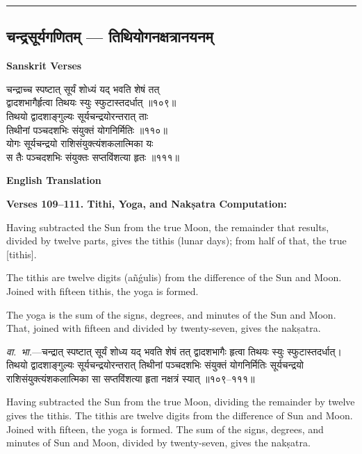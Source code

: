 \documentclass[11pt,a4paper]{article}
\newcommand{\longline}{\noindent\rule{\textwidth}{0.4pt}}
\newcommand{\dev}[1]{{\devanagarifont #1}}
\newcommand{\sectsep}{\par\vspace{0.8em}\longline\vspace{0.8em}}
\begin{document}
\sectsep

\subsection{\dev{चन्द्रसूर्यगणितम् --- तिथियोगनक्षत्रानयनम्}}
\label{subsec:luni-solar}

\begin{minipage}[t]{0.48\textwidth}
\textbf{\small Sanskrit Verses}

\small\devanagarifont
चन्द्राच्च स्पष्टात् सूर्यं शोध्यं यद् भवति शेषं तत्\\
द्वादशभागैर्हृत्वा तिथयः स्युः स्फुटास्तदर्धात् ॥१०९॥\\[0.5em]
तिथयो द्वादशाङ्गुल्यः सूर्यचन्द्रयोरन्तरात् ताः\\
तिथीनां पञ्चदशभिः संयुक्तं योगनिर्मितिः ॥११०॥\\[0.5em]
योगः सूर्यचन्द्रयो राशिसंयुक्त्यंशकलात्मिका यः\\
स तैः पञ्चदशभिः संयुक्तः सप्तविंशत्या हृतः ॥१११॥
\end{minipage}%
\hfill
\begin{minipage}[t]{0.48\textwidth}
\textbf{\small English Translation}

\textbf{Verses 109--111. Tithi, Yoga, and Nak\d{s}atra Computation:}

Having subtracted the Sun from the true Moon, the remainder that results, divided by twelve parts, gives the tithis (lunar days); from half of that, the true [tithis].

The tithis are twelve digits (a\~n\'gulis) from the difference of the Sun and Moon. Joined with fifteen tithis, the yoga is formed.

The yoga is the sum of the signs, degrees, and minutes of the Sun and Moon. That, joined with fifteen and divided by twenty-seven, gives the nak\d{s}atra.
\end{minipage}

\vspace{0.5em}
\begin{minipage}[t]{0.48\textwidth}
\small\devanagarifont
\textit{वा.~भा.}---चन्द्रात् स्पष्टात् सूर्यं शोध्य यद् भवति शेषं तत् द्वादशभागैः हृत्वा तिथयः स्युः स्फुटास्तदर्धात्। तिथयो द्वादशाङ्गुल्यः सूर्यचन्द्रयोरन्तरात् तिथीनां पञ्चदशभिः संयुक्तं योगनिर्मितिः सूर्यचन्द्रयो राशिसंयुक्त्यंशकलात्मिका सा सप्तविंशत्या हृता नक्षत्रं स्यात् ॥१०९--१११॥
\end{minipage}%
\hfill
\begin{minipage}[t]{0.48\textwidth}
\small
Having subtracted the Sun from the true Moon, dividing the remainder by twelve gives the tithis. The tithis are twelve digits from the difference of Sun and Moon. Joined with fifteen, the yoga is formed. The sum of the signs, degrees, and minutes of Sun and Moon, divided by twenty-seven, gives the nak\d{s}atra.
\end{minipage}
\end{document}
